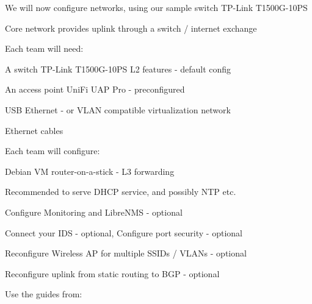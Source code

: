 \documentclass[Screen16to9,17pt]{foils}
\begin{document}

We will now configure networks, using our sample switch TP-Link T1500G-10PS

\begin{list1}
\item Core network provides uplink through a switch / internet exchange
\item Each team will need:
\begin{list2}
\item A switch TP-Link T1500G-10PS L2 features - default config
\item An access point UniFi UAP Pro - preconfigured
\item USB Ethernet - or VLAN compatible virtualization network
\item Ethernet cables
\end{list2}
\end{list1}




\begin{list1}
\item Each team will configure:
\begin{list2}
\item Debian VM router-on-a-stick - L3 forwarding
{\small{}}
\item Recommended to serve DHCP service, and possibly NTP etc.
\item Configure Monitoring and LibreNMS - optional
\item Connect your IDS - optional, Configure port security - optional
\item Reconfigure Wireless AP for multiple SSIDs / VLANs - optional
\item Reconfigure uplink from static routing to BGP - optional
\end{list2}
\end{list1}

Use the guides from:\\
{\small {}}







\slidenext
\end{document}
